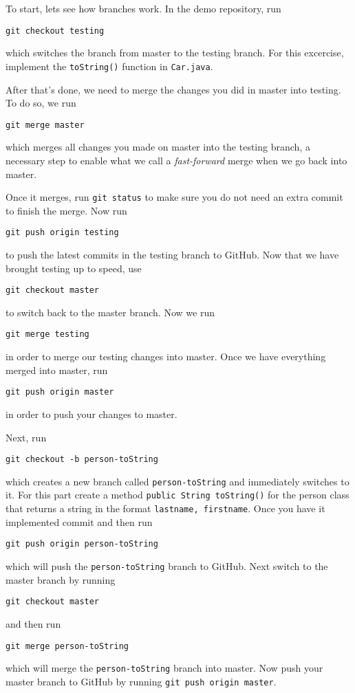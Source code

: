 \documentclass[notitlepage]{simple}
\begin{document}
To start, lets see how branches work.
In the demo repository, run
\begin{terminal}
	\verb|git checkout testing|
\end{terminal}
which switches the branch from master to the testing branch.
For this excercise, implement the \verb|toString()| function in \verb|Car.java|.

After that's done, we need to merge the changes you did in master into testing.
To do so, we run
\begin{terminal}
	\verb|git merge master|
\end{terminal}
which merges all changes you made on master into the testing branch, a necessary step to enable what we call a \textit{fast-forward} merge when we go back into master.

Once it merges, run \verb|git status| to make sure you do not need an extra commit to finish the merge.
Now run
\begin{terminal}
	\verb|git push origin testing|
\end{terminal}
to push the latest commits in the testing branch to GitHub.
Now that we have brought testing up to speed, use
\begin{terminal}
	\verb|git checkout master|
\end{terminal}
to switch back to the master branch.
Now we run
\begin{terminal}
	\verb|git merge testing|
\end{terminal}
in order to merge our testing changes into master.
Once we have everything merged into master, run
\begin{terminal}
	\verb|git push origin master|
\end{terminal}
in order to push your changes to master.

Next, run
\begin{terminal}
	\verb|git checkout -b person-toString|
\end{terminal}
which creates a new branch called \verb|person-toString| and immediately switches to it.
For this part create a method \verb|public String toString()| for the person class that returns a string in the format \linebreak\verb|lastname, firstname|.
Once you have it implemented commit and then run
\begin{terminal}
	\verb|git push origin person-toString|
\end{terminal}
which will push the \verb|person-toString| branch to GitHub.
Next switch to the master branch by running
\begin{terminal}
	\verb|git checkout master|
\end{terminal}
and then run
\begin{terminal}
	\verb|git merge person-toString|
\end{terminal}
which will merge the \verb|person-toString| branch into master.
Now push your master branch to GitHub by running \verb|git push origin master|.
\end{document}
